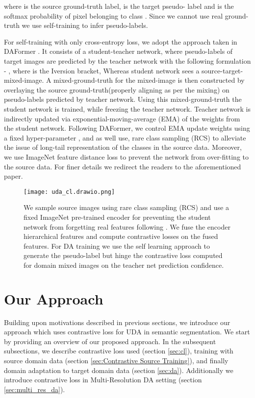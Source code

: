 \documentclass{article}
\begin{document}
where  is the source ground-truth label,  is the target pseudo- label and  is the softmax probability of  pixel belonging
to class . 
Since we cannot use real ground- truth we use self-training \cite{zhang2021prototypical, zhu2020improving, hoyer2021daformer, wang2021domain} to infer pseudo-labels. 

For self-training with only cross-entropy loss, we adopt the approach taken in DAFormer \cite{hoyer2021daformer}. It consists of a student-teacher network, where pseudo-labels of target images are predicted by the teacher network  with the following formulation - , where  is the Iversion bracket, 
Whereas student network sees a source-target-mixed-image.
A mixed-ground-truth for the mixed-image is then constructed by overlaying the source ground-truth(properly aligning as per the mixing) on pseudo-labels predicted by teacher network. Using this mixed-ground-truth the student network is trained, while freezing the teacher network. Teacher network is indirectly updated via exponential-moving-average (EMA) of the weights from the student network. Following DAFormer, we control EMA update weights using a fixed hyper-parameter , and as well use, rare class sampling (RCS) to alleviate the issue of long-tail representation of the classes in the source data. Moreover, we use ImageNet \cite{deng2009imagenet} feature distance loss to prevent the network from over-fitting to the source data. For finer details we redirect the readers to the aforementioned paper.
\begin{figure*}
\begin{center}
\texttt{[image: uda\_cl.drawio.png]}           
\end{center}
\scriptsize
\caption{We sample source images using rare class sampling (RCS) and use a fixed ImageNet pre-trained encoder for preventing the student network from forgetting real features following \cite{hoyer2021daformer}. We fuse the encoder hierarchical features and compute contrastive losses on the fused features. For DA training we use the self learning approach to generate the pseudo-label but hinge the contrastive loss computed for domain mixed images on the teacher net prediction confidence.}
\label{fig:full_model}
\end{figure*}

\section{Our Approach}
Building upon motivations described in previous sections, we introduce our approach which uses contrastive loss for UDA in semantic segmentation. We start by providing an overview of our proposed approach. In the subsequent subsections, we describe contrastive loss used (section \ref{sec:cl}), training with source domain data (section \ref{sec:Contrastive Source Training}), and finally domain adaptation to target domain data (section \ref{sec:da}). Additionally we introduce contrastive loss in Multi-Resolution DA setting (section \ref{sec:multi_res_da}).
\end{document}
